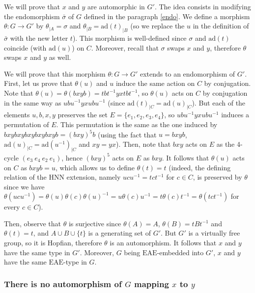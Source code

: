 \documentclass[a4paper, 11pt]{amsart}
\theoremstyle{definition}
\theoremstyle{remark}
\begin{document}
\smallskip \noindent
We will prove that $x$ and $y$ are automorphic in $G'$. The idea consists in modifying the endomorphism $\bar{\sigma}$ of $G$ defined in the paragraph \ref{endo}. We define a morphism $\theta : G \rightarrow G'$ by $\theta_{\vert A}=\sigma$ and $\theta_{\vert B}=\mathrm{ad}(t)_{\vert B}$ (so we replace the $u$ in the definition of $\bar{\sigma}$ with the new letter $t$). This morphism is well-defined since $\sigma$ and $\mathrm{ad}(t)$ coincide (with $\mathrm{ad}(u)$) on $C$. Moreover, recall that $\sigma$ swaps $x$ and $y$, therefore $\theta$ swaps $x$ and $y$ as well. 

\smallskip \noindent
We will prove that this morphism $\theta : G \rightarrow G'$ extends to an endomorphism of $G'$. First, let us prove that $\theta(u)$ and $u$ induce the same action on $C$ by conjugation. Note that $\theta(u)=\theta(bxyb)=tbt^{-1}yxtbt^{-1}$, so $\theta(u)$ acts on $C$ by conjugation in the same way as $ubu^{-1}yxubu^{-1}$ (since $\mathrm{ad}(t)_{\vert C}=\mathrm{ad}(u)_{\vert C}$). But each of the elements $u,b,x,y$ preserves the set $E=\lbrace e_1,e_2,e_3,e_4\rbrace$, so $ubu^{-1}yxubu^{-1}$ induces a permutation of $E$. This permutation is the same as the one induced by $bxybxybxybxybxyb=(bxy)^5b$ (using the fact that $u=bxyb$, $\mathrm{ad}(u)_{\vert C}=\mathrm{ad}(u^{-1})_{\vert C}$ and $xy=yx$). Then, note that $bxy$ acts on $E$ as the 4-cycle $(e_3 \ e_4 \ e_2 \ e_1)$, hence $(bxy)^5$ acts on $E$ as $bxy$. It follows that $\theta(u)$ acts on $C$ as $bxyb=u$, which allows us to define $\theta(t)=t$ (indeed, the defining relation of the HNN extension, namely $ucu^{-1}=tct^{-1}$ for $c\in C$, is preserved by $\theta$ since we have $\theta(ucu^{-1})=\theta(u)\theta(c)\theta(u)^{-1}=u\theta(c)u^{-1}=t\theta(c)t^{-1}=\theta(tct^{-1})$ for every $c\in C$).

\smallskip \noindent
Then, observe that $\theta$ is surjective since $\theta(A)=A$, $\theta(B)=tBt^{-1}$ and $\theta(t)=t$, and $A\cup B\cup\lbrace t\rbrace$ is a generating set of $G'$. But $G'$ is a virtually free group, so it is Hopfian, therefore $\theta$ is an automorphism. It follows that $x$ and $y$ have the same type in $G'$. Moreover, $G$ being $\mathrm{EAE}$-embedded into $G'$, $x$ and $y$ have the same $\mathrm{EAE}$-type in $G$.


\subsubsection{There is no automorphism of $G$ mapping $x$ to $y$}
\end{document}
